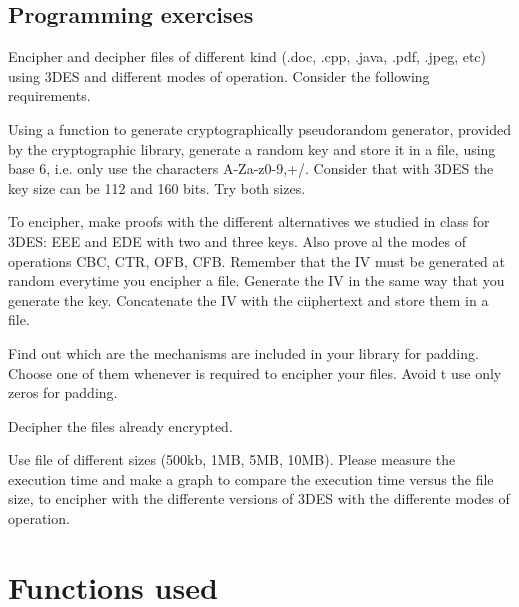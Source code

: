\documentclass[12pt]{article}
\begin{document}
        \subsection{Programming exercises}
            Encipher and decipher files of different kind (.doc, .cpp, .java, .pdf, .jpeg, etc) using 3DES and different modes of operation. Consider the following requirements.

            \begin{numerate}
                \item Using a function to generate cryptographically pseudorandom generator, provided by the cryptographic library, generate a random key and store it in a file, using base 6, i.e. only use the characters A-Za-z0-9,+/. Consider that with 3DES the key size can be 112 and 160 bits. Try both sizes.

                \item To encipher, make proofs with the different alternatives we studied in class for 3DES: EEE and EDE with two and three keys. Also prove al the modes of operations CBC, CTR, OFB, CFB. Remember that the IV must be generated at random everytime you encipher a file. Generate the IV in the same way that you generate the key. Concatenate the IV with the ciiphertext and store them in a file.

                \item Find out which are the mechanisms are included in your library for padding. Choose one of them whenever is required to encipher your files. Avoid t use only zeros for padding.

                \item Decipher the files already encrypted.

                \item Use file of different sizes (500kb, 1MB, 5MB, 10MB). Please measure the execution time and make a graph to compare the execution time versus the file size, to encipher with the differente versions of 3DES with the differente modes of operation.

            \end{numerate}


    \section{Functions used}
\end{document}
